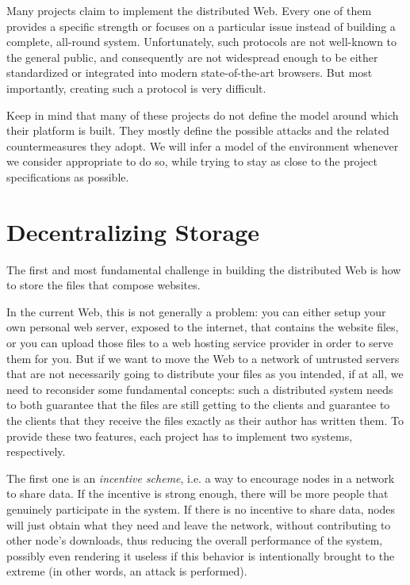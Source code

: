 \documentclass[mscthesis]{usiinfthesis}
\begin{document}
Many projects claim to implement the distributed Web. Every one of them provides a specific strength or focuses on a particular issue instead of building a complete, all-round system.
Unfortunately, such protocols are not well-known to the general public, and consequently are not widespread enough to be either standardized or integrated into modern state-of-the-art browsers.
But most importantly, creating such a protocol is very difficult.

Keep in mind that many of these projects do not define the model around which their platform is built. They mostly define the possible attacks and the related countermeasures they adopt. We will infer a model of the environment whenever we consider appropriate to do so, while trying to stay as close to the project specifications as possible.


\chapter{Decentralizing Storage}\label{ch:storage}

The first and most fundamental challenge in building the distributed Web is how to store the files that compose websites.

In the current Web, this is not generally a problem: you can either setup your own personal web server, exposed to the internet, that contains the website files, or you can upload those files to a web hosting service provider in order to serve them for you.
But if we want to move the Web to a network of untrusted servers that are not necessarily going to distribute your files as you intended, if at all, we need to reconsider some fundamental concepts: such a distributed system needs to both guarantee that the files are still getting to the clients and guarantee to the clients that they receive the files exactly as their author has written them. To provide these two features, each project has to implement two systems, respectively.

The first one is an \emph{incentive scheme}, i.e. a way to encourage nodes in a network to share data. If the incentive is strong enough, there will be more people that genuinely participate in the system. If there is no incentive to share data, nodes will just obtain what they need and leave the network, without contributing to other node's downloads, thus reducing the overall performance of the system, possibly even rendering it useless if this behavior is intentionally brought to the extreme (in other words, an attack is performed).
\end{document}
